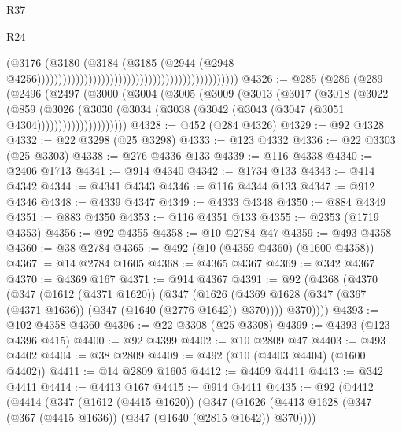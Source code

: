 \begin{lexlean}{R37}
\begin{lexlean}{R24}
\begin{coremodule}
{{{{{{{{{{{{{{{{{{{{{{{{{{{{{{{{{{{{{{{{{{{{{{{{{{{{{{{{{{{{{{{{{{{{{{{{{{{{{{{{{{{{{{{{{{{{{{{{{{{{{{{{{{{{{{{{{{{{{{{{{{{{{{{{{{{{{{{{{{{{{{{{{{{{{{{{{{{{{{{{{{{{{{{{{{{{{{{{{{{{{{{{{                                                                                      (@3176
                                                                                        (@3180
                                                                                          (@3184
                                                                                            (@3185
                                                                                              (@2944
                                                                                                (@2948
                                                                                                  @4256)))))))))))))))))))))))))))))))))))))))))))))))
@4326 := @285
    (@286
      (@289
        (@2496
          (@2497
            (@3000
              (@3004
                (@3005
                  (@3009
                    (@3013
                      (@3017
                        (@3018
                          (@3022
                            (@859
                              (@3026
                                (@3030
                                  (@3034
                                    (@3038 (@3042 (@3043 (@3047 (@3051 @4304)))))))))))))))))))))
@4328 := @452 (@284 @4326)
@4329 := @92 @4328
@4332 := @22 @3298 (@25 @3298)
@4333 := @123 @4332
@4336 := @22 @3303 (@25 @3303)
@4338 := @276 @4336 @133
@4339 := @116 @4338
@4340 := @2406 @1713
@4341 := @914 @4340
@4342 := @1734 @133
@4343 := @414 @4342
@4344 := @4341 @4343
@4346 := @116 @4344 @133
@4347 := @912 @4346
@4348 := @4339 @4347
@4349 := @4333 @4348
@4350 := @884 @4349
@4351 := @883 @4350
@4353 := @116 @4351 @133
@4355 := @2353 (@1719 @4353)
@4356 := @92 @4355
@4358 := @10 @2784 @47
@4359 := @493 @4358
@4360 := @38 @2784
@4365 := @492 (@10 (@4359 @4360) (@1600 @4358))
@4367 := @14 @2784 @1605
@4368 := @4365 @4367
@4369 := @342 @4367
@4370 := @4369 @167
@4371 := @914 @4367
@4391 := @92
    (@4368
      (@4370
        (@347
          (@1612 (@4371 @1620))
          (@347
            (@1626 (@4369 @1628 (@347 (@367 (@4371 @1636)) (@347 (@1640 (@2776 @1642)) @370))))
            @370))))
@4393 := @102 @4358 @4360
@4396 := @22 @3308 (@25 @3308)
@4399 := @4393 (@123 @4396 @415)
@4400 := @92 @4399
@4402 := @10 @2809 @47
@4403 := @493 @4402
@4404 := @38 @2809
@4409 := @492 (@10 (@4403 @4404) (@1600 @4402))
@4411 := @14 @2809 @1605
@4412 := @4409 @4411
@4413 := @342 @4411
@4414 := @4413 @167
@4415 := @914 @4411
@4435 := @92
    (@4412
      (@4414
        (@347
          (@1612 (@4415 @1620))
          (@347
            (@1626 (@4413 @1628 (@347 (@367 (@4415 @1636)) (@347 (@1640 (@2815 @1642)) @370))))
}}}}}}}}}}}}}}}}}}}}}}}}}}}}}}}}}}}}}}}}}}}}}}}}}}}}}}}}}}}}}}}}}}}}}}}}}}}}}}}}}}}}}}}}}}}}}}}}}}}}}}}}}}}}}}}}}}}}}}}}}}}}}}}}}}}}}}}}}}}}}}}}}}}}}}}}}}}}}}}}}}}}}}}}}}}}}}}}}}}}}}}}}
\end{coremodule}
\end{lexlean}
\end{lexlean}
